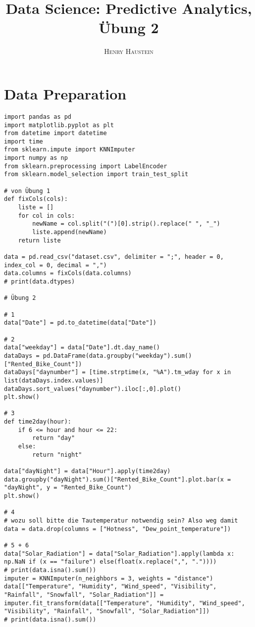 \documentclass{article}
\title{\textbf{Data Science: Predictive Analytics, Übung 2}}
\author{\textsc{Henry Haustein}}
\date{}
\begin{document}
	\maketitle

	\section*{Data Preparation}
	\begin{lstlisting}[tabsize=2]
import pandas as pd
import matplotlib.pyplot as plt
from datetime import datetime
import time
from sklearn.impute import KNNImputer
import numpy as np
from sklearn.preprocessing import LabelEncoder
from sklearn.model_selection import train_test_split

# von Übung 1
def fixCols(cols):
	liste = []
	for col in cols:
		newName = col.split("(")[0].strip().replace(" ", "_")
		liste.append(newName)
	return liste

data = pd.read_csv("dataset.csv", delimiter = ";", header = 0, index_col = 0, decimal = ",")
data.columns = fixCols(data.columns)
# print(data.dtypes)

# Übung 2

# 1
data["Date"] = pd.to_datetime(data["Date"])

# 2
data["weekday"] = data["Date"].dt.day_name()
dataDays = pd.DataFrame(data.groupby("weekday").sum()["Rented_Bike_Count"])
dataDays["daynumber"] = [time.strptime(x, "%A").tm_wday for x in list(dataDays.index.values)]
dataDays.sort_values("daynumber").iloc[:,0].plot()
plt.show()

# 3
def time2day(hour):
	if 6 <= hour and hour <= 22:
		return "day"
	else:
		return "night"

data["dayNight"] = data["Hour"].apply(time2day)
data.groupby("dayNight").sum()["Rented_Bike_Count"].plot.bar(x = "dayNight", y = "Rented_Bike_Count")
plt.show()

# 4
# wozu soll bitte die Tautemperatur notwendig sein? Also weg damit
data = data.drop(columns = ["Hotness", "Dew_point_temperature"])

# 5 + 6
data["Solar_Radiation"] = data["Solar_Radiation"].apply(lambda x: np.NaN if (x == "failure") else(float(x.replace(",", "."))))
# print(data.isna().sum())
imputer = KNNImputer(n_neighbors = 3, weights = "distance")
data[["Temperature", "Humidity", "Wind_speed", "Visibility", "Rainfall", "Snowfall", "Solar_Radiation"]] = imputer.fit_transform(data[["Temperature", "Humidity", "Wind_speed", "Visibility", "Rainfall", "Snowfall", "Solar_Radiation"]])
# print(data.isna().sum())


\end{lstlisting}
\end{document}
